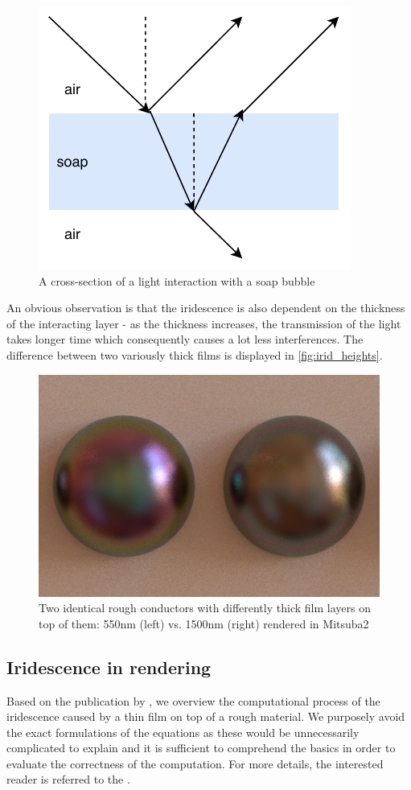 \begin{figure}[h]
	\centering
	\includegraphics[width=.6\linewidth]{img/soap.pdf}
	\caption{A cross-section of a light interaction with a soap bubble}
	\label{fig:soap}
\end{figure}

An obvious observation is that the iridescence is also dependent on the thickness of the interacting layer - as the thickness increases, the transmission of the light takes longer time which consequently causes a lot less interferences. The difference between two variously thick films is displayed in \autoref{fig:irid_heights}.

\begin{figure}[h]
	\centering
	\includegraphics[width=.6\linewidth]{img/irid_heights.png}
	\caption{Two identical rough conductors with differently thick film layers on top of them: 550nm (left) vs. 1500nm (right) rendered in Mitsuba2}
	\label{fig:irid_heights}
\end{figure}

\subsection{Iridescence in rendering}

Based on the publication by \citet{belcour2017practical}, we overview the computational process of the iridescence caused by a thin film on top of a rough material. We purposely avoid the exact formulations of the equations as these would be unnecessarily complicated to explain and it is sufficient to comprehend the basics in order to evaluate the correctness of the computation. For more details, the interested reader is referred to the \citet{belcour2017practical}.

